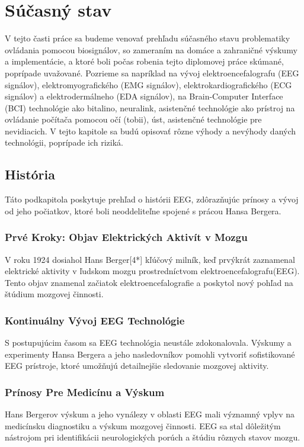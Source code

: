 \chapter{Súčasný stav}

\tab[5 mm] V tejto časti práce sa budeme venovať prehľadu súčasného stavu problematiky ovládania pomocou biosignálov, so zameraním na domáce a zahraničné výskumy a implementácie, a ktoré boli počas robenia tejto diplomovej práce skúmané, poprípade uvažované. Pozrieme sa napríklad na vývoj elektroencefalografu (EEG signálov),  elektromyografického (EMG signálov), elektrokardiografického (ECG signálov) a elektrodermálneho (EDA signálov), na Brain-Computer Interface (BCI) technológie ako bitalino, neuralink, asistenčné technológie ako prístroj na ovládanie počítača pomocou očí (tobii), úst, asistenčné technológie pre nevidiacich. V tejto kapitole sa budú opisovať rôzne výhody a nevýhody daných technológii, poprípade ich riziká.


\section{História}
\tab[5 mm] Táto podkapitola poskytuje prehľad o histórii EEG, zdôrazňujúc prínosy a vývoj od jeho počiatkov, ktoré boli neoddeliteľne spojené s prácou Hansa Bergera.
\subsection{Prvé Kroky: Objav Elektrických Aktivít v Mozgu}
\tab[5 mm] V roku 1924 dosiahol Hans Berger[4*] kľúčový milník, keď prvýkrát zaznamenal elektrické aktivity v ľudskom mozgu prostredníctvom elektroencefalografu(EEG). Tento objav znamenal začiatok elektroencefalografie a poskytol nový pohľad na štúdium mozgovej činnosti.\\
\subsection{Kontinuálny Vývoj EEG Technológie}
\tab[5 mm] S postupujúcim časom sa EEG technológia neustále zdokonalovala. Výskumy a experimenty Hansa Bergera a jeho nasledovníkov pomohli vytvoriť sofistikované EEG prístroje, ktoré umožňujú detailnejšie sledovanie mozgovej aktivity.
\subsection{Prínosy Pre Medicínu a Výskum}

\tab[5 mm] Hans Bergerov výskum a jeho vynálezy v oblasti EEG mali významný vplyv na medicínsku diagnostiku a výskum mozgovej činnosti. EEG sa stal dôležitým nástrojom pri identifikácii neurologických porúch a štúdiu rôznych stavov mozgu.

